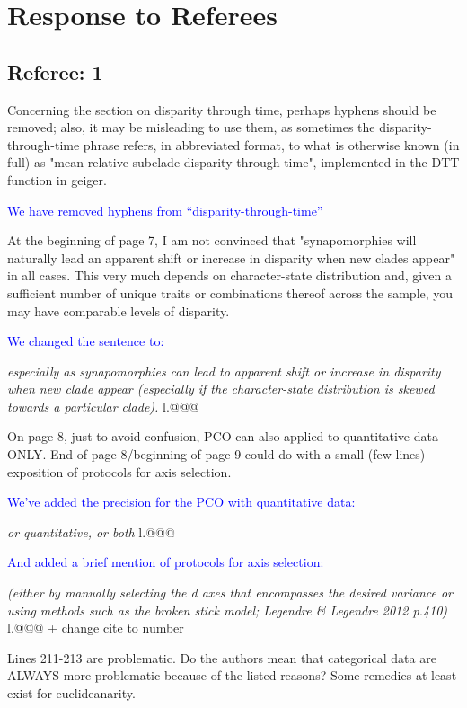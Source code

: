\documentclass[12pt,letterpaper]{article}
\begin{document}
\section{Response to Referees}

\subsection{Referee: 1}
Concerning the section on disparity through time, perhaps hyphens should be removed; also, it may be misleading to use them, as sometimes the disparity-through-time phrase refers, in abbreviated format, to what is otherwise known (in full) as "mean relative subclade disparity through time", implemented in the DTT function in geiger.

\textcolor{blue}{We have removed hyphens from ``disparity-through-time''}

At the beginning of page 7, I am not convinced that "synapomorphies will naturally lead an apparent shift or increase in disparity when new clades appear" in all cases. This very much depends on character-state distribution and, given a sufficient number of unique traits or combinations thereof across the sample, you may have comparable levels of disparity.

\textcolor{blue}{We changed the sentence to:}

\textit{especially as synapomorphies can lead to apparent shift or increase in disparity when new clade appear (especially if the character-state distribution is skewed towards a particular clade).} l.@@@

On page 8, just to avoid confusion, PCO can also applied to quantitative data ONLY. End of page 8/beginning of page 9 could do with a small (few lines) exposition of protocols for axis selection.

\textcolor{blue}{We've added the precision for the PCO with quantitative data:}

\textit{or quantitative, or both} l.@@@

\textcolor{blue}{And added a brief mention of protocols for axis selection:}

\textit{(either by manually selecting the d axes that encompasses the desired variance or using methods such as the broken stick model; Legendre \& Legendre 2012 p.410)} l.@@@ + change cite to number

Lines 211-213 are problematic. Do the authors mean that categorical data are ALWAYS more problematic because of the listed reasons? Some remedies at least exist for euclideanarity.
\end{document}
